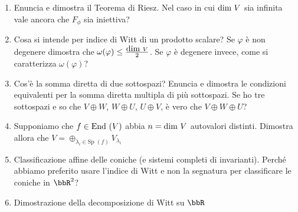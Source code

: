 \documentclass[a4paper,NoNotes,GeneralMath]{stdmdoc}
\begin{document}
\begin{enumerate}
		\item Enuncia e dimostra il Teorema di Riesz. Nel caso in cui $\mbox{dim } V$ sia infinita vale ancora che $F_\phi$ sia iniettiva?
		\item Cosa si intende per indice di Witt di un prodotto scalare? Se $\varphi$ è non degenere dimostra che $\omega(\varphi) \le \frac{\mbox{dim } V}{2}$. Se $\varphi$ è degenere invece, come si caratterizza $\omega(\varphi)$?
		\item Cos'è la somma diretta di due sottospazi? Enuncia e dimostra le condizioni equivalenti per la somma diretta multipla di più sottospazi. Se ho tre sottospazi e so che $V\oplus W$, $W\oplus U$, $U\oplus V$, è vero che $V\oplus W\oplus U$?
		\item Supponiamo che $f\in\mbox{End }(V)$ abbia $n = \mbox{dim } V$ autovalori distinti. Dimostra allora che $V = \oplus_{\lambda_i \in \text{Sp }(f)} V_{\lambda_i}$
		\item Classificazione affine delle coniche (e sistemi completi di invarianti). Perché abbiamo preferito usare l'indice di Witt e non la segnatura per classificare le coniche in $\bbR^2$?
		\item Dimostrazione della decomposizione di Witt su $\bbR$
	\end{enumerate}
\end{document}
